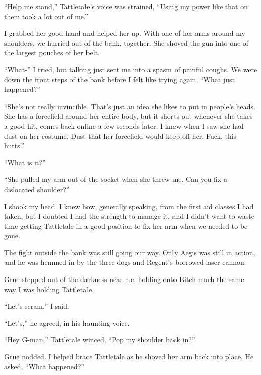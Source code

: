``Help me stand,'' Tattletale's voice was strained, ``Using my power like that on them took a lot out of me.''



I grabbed her good hand and helped her up.  With one of her arms around my shoulders, we hurried out of the bank, together.  She shoved the gun into one of the largest pouches of her belt.



``What-'' I tried, but talking just sent me into a spasm of painful coughs.  We were down the front steps of the bank before I felt like trying again, ``What just happened?''



``She's not really invincible.  That's just an idea she likes to put in people's heads.  She has a forcefield around her entire body, but it shorts out whenever she takes a good hit, comes back online a few seconds later.  I knew when I saw she had dust on her costume.  Dust that her forcefield would keep off her.  Fuck, this hurts.''



``What is it?''



``She pulled my arm out of the socket when she threw me.  Can you fix a dislocated shoulder?''



I shook my head.  I knew how, generally speaking, from the first aid classes I had taken, but I doubted I had the strength to manage it, and I didn't want to waste time getting Tattletale in a good position to fix her arm when we needed to be gone.



The fight outside the bank was still going our way.  Only Aegis was still in action, and he was hemmed in by the three dogs and Regent's borrowed laser cannon.



Grue stepped out of the darkness near me, holding onto Bitch much the same way I was holding Tattletale.



``Let's scram,'' I said.



``Let's,'' he agreed, in his haunting voice.



``Hey G-man,'' Tattletale winced, ``Pop my shoulder back in?''



Grue nodded.  I helped brace Tattletale as he shoved her arm back into place.  He asked, ``What happened?''



